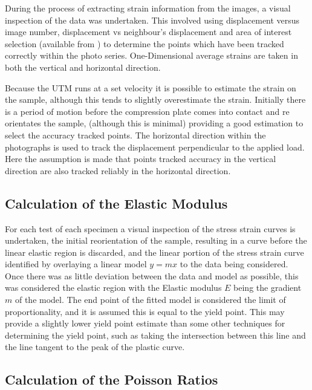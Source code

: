 \documentclass[10pt]{article}
\begin{document}
During the process of extracting strain information from the images, a visual inspection of the data was undertaken. This involved using displacement versus image number, displacement vs neighbour's displacement and area of interest selection (available from \citet{chris_eberl_robert_thompson_daniel_gianola_digital_2006}) to determine the points which have been tracked correctly within the photo series. One-Dimensional average strains are taken in both the vertical and horizontal direction.

Because the UTM runs at a set velocity it is possible to estimate the strain on the sample, although this tends to slightly overestimate the strain. Initially there is a period of motion before the compression plate comes into contact and re orientates  the sample, (although this is minimal) providing a good estimation to select the accuracy tracked points. The horizontal direction within the photographs is used to track the displacement perpendicular to the applied load. Here the assumption is made that points tracked accuracy in the vertical direction are also tracked reliably in the horizontal direction.

\subsection{Calculation of the Elastic Modulus}
\label{sec:calc_E}
For each test of each specimen a visual inspection of the stress strain curves is undertaken, the initial reorientation of the sample, resulting in a curve before the linear elastic region is discarded, and the linear portion of the stress strain curve identified by overlaying a linear model \(y=mx\) to the data being considered. Once there was as little deviation between the data and model as possible, this was considered the elastic region with the Elastic modulus \(E\) being the gradient \(m\) of the model. The end point of the fitted model is considered the limit of proportionality, and it is assumed this is equal to the yield point. This may provide a slightly lower yield point estimate than some other techniques for determining the yield point, such as taking the  intersection  between this line and the line tangent to the peak of the plastic curve.

\subsection{Calculation of the Poisson Ratios}
\end{document}
